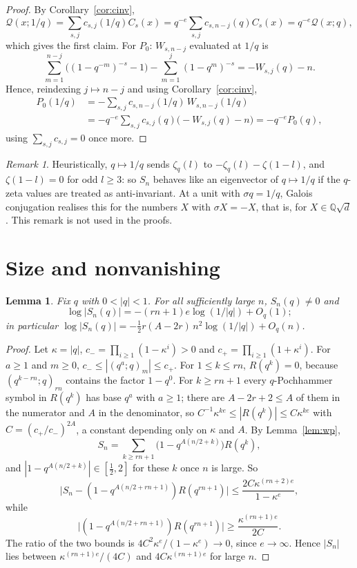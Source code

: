 \documentclass[11pt]{amsart}
\newtheorem{lemma}[theorem]{Lemma}
\theoremstyle{definition}
\theoremstyle{remark}
\newtheorem{remark}[theorem]{Remark}
\numberwithin{equation}{section}
\newcommand{\QQ}{\mathbb{Q}}
\begin{document}
\begin{proof}
By Corollary~\ref{cor:cinv},
\[
\mathcal Q(x;1/q)=\sum_{s,j}c_{s,j}(1/q)C_s(x)=q^{-e}\sum_{s,j}c_{s,n-j}(q)C_s(x)=q^{-e}\mathcal Q(x;q),
\]
which gives the first claim. For $P_0$: $W_{s,n-j}$ evaluated at $1/q$ is
\[
\sum_{m=1}^{n-j}\bigl((1-q^{-m})^{-s}-1\bigr)-\sum_{m=1}^j(1-q^m)^{-s}=-W_{s,j}(q)-n.
\]
Hence, reindexing $j\mapsto n-j$ and using Corollary~\ref{cor:cinv},
\begin{align*}
P_0(1/q)&=-\sum_{s,j}c_{s,n-j}(1/q)\,W_{s,n-j}(1/q)\\
&=-q^{-e}\sum_{s,j}c_{s,j}(q)\bigl(-W_{s,j}(q)-n\bigr)=-q^{-e}P_0(q),
\end{align*}
using $\sum_{s,j}c_{s,j}=0$ once more.
\end{proof}

\begin{remark}
Heuristically, $q\mapsto1/q$ sends $\zeta_q(l)$ to $-\zeta_q(l)-\zeta(1-l)$, and $\zeta(1-l)=0$ for odd $l\ge3$: so
$S_n$ behaves like an eigenvector of $q\mapsto1/q$ if the $q$-zeta values are treated as anti-invariant. At a unit with
$\sigma q=1/q$, Galois conjugation realises this for the numbers $X$ with $\sigma X=-X$, that is, for $X\in\QQ\sqrt d$.
This remark is not used in the proofs.
\end{remark}

\section{Size and nonvanishing}\label{sec:size}

\begin{lemma}\label{lem:size}
Fix $q$ with $0<|q|<1$. For all sufficiently large $n$, $S_n(q)\ne0$ and
\[
\log|S_n(q)|=-(rn+1)e\log(1/|q|)+O_q(1);
\]
in particular $\log|S_n(q)|=-\frac12r(A-2r)\,n^2\log(1/|q|)+O_q(n)$.
\end{lemma}

\begin{proof}
Let $\kappa=|q|$, $c_-=\prod_{i\ge1}(1-\kappa^i)>0$ and $c_+=\prod_{i\ge1}(1+\kappa^i)$. For $a\ge1$ and $m\ge0$,
$c_-\le|(q^a;q)_m|\le c_+$. For $1\le k\le rn$, $R(q^k)=0$, because $(q^{k-rn};q)_{rn}$ contains the factor $1-q^0$.
For $k\ge rn+1$ every $q$-Pochhammer symbol in $R(q^k)$ has base $q^a$ with $a\ge1$; there are $A-2r+2\le A$ of them in
the numerator and $A$ in the denominator, so $C^{-1}\kappa^{ke}\le|R(q^k)|\le C\kappa^{ke}$ with $C=(c_+/c_-)^{2A}$,
a constant depending only on $\kappa$ and $A$.
By Lemma~\ref{lem:wp},
\[
S_n=\sum_{k\ge rn+1}\bigl(1-q^{A(n/2+k)}\bigr)R(q^k),
\]
and $|1-q^{A(n/2+k)}|\in[\frac12,2]$ for these $k$ once $n$ is large. So
\[
\bigl|S_n-(1-q^{A(n/2+rn+1)})R(q^{rn+1})\bigr|\le\frac{2C\kappa^{(rn+2)e}}{1-\kappa^e},
\]
while
\[
\bigl|(1-q^{A(n/2+rn+1)})R(q^{rn+1})\bigr|\ge\frac{\kappa^{(rn+1)e}}{2C}.
\]
The ratio of the two bounds is $4C^2\kappa^e/(1-\kappa^e)\to0$, since $e\to\infty$. Hence $|S_n|$ lies between
$\kappa^{(rn+1)e}/(4C)$ and $4C\kappa^{(rn+1)e}$ for large $n$.
\end{proof}
\end{document}
